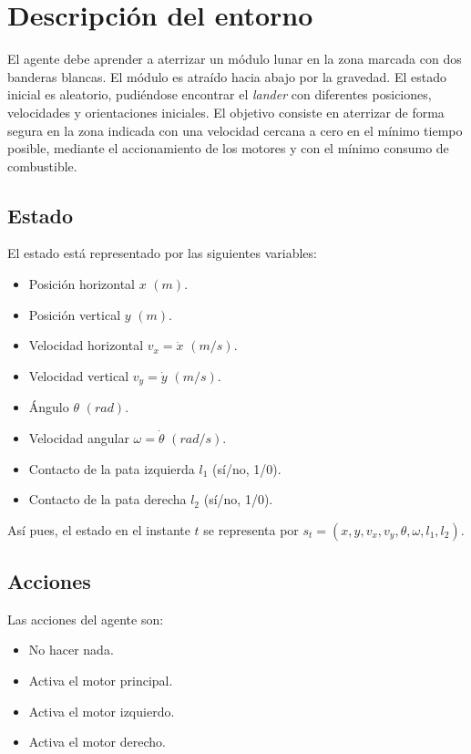 \documentclass{article}
\begin{document}

\section{Descripción del entorno}
El agente debe aprender a aterrizar un módulo lunar en la zona marcada con dos banderas blancas. El módulo es atraído hacia abajo por la gravedad. El estado inicial es aleatorio, pudiéndose encontrar el \textit{lander} con diferentes posiciones, velocidades y orientaciones iniciales. El objetivo consiste en aterrizar de forma segura en la zona indicada con una velocidad cercana a cero en el mínimo tiempo posible, mediante el accionamiento de los motores y con el mínimo consumo de combustible.

\subsection{Estado}
El estado está representado por las siguientes variables:
\begin{itemize}
    \item[1.] Posición horizontal $x$ $(m)$.
  \item[2.] Posición vertical $y$ $(m)$.
  \item[3.] Velocidad horizontal $v_x=\dot{x}$ $(m/s)$.
  \item[4.] Velocidad vertical $v_y=\dot{y}$ $(m/s)$.
  \item[5.] Ángulo $\theta$ $(rad)$.
  \item[6.] Velocidad angular $\omega=\dot{\theta}$ $(rad/s)$.
  \item[7.] Contacto de la pata izquierda $l_1$ (sí/no, 1/0).
  \item[8.] Contacto de la pata derecha $l_2$ (sí/no, 1/0).
\end{itemize}

Así pues, el estado en el instante $t$ se representa por $s_t=(x, y, v_x, v_y, \theta, \omega, l_1, l_2)$.

\subsection{Acciones}
Las acciones del agente son:
\begin{itemize}
    \item[ 1.] No hacer nada.
    \item[2.] Activa el motor principal.
  \item[3.] Activa el motor izquierdo.
  \item[4.] Activa el motor derecho.
\end{itemize}
\end{document}
